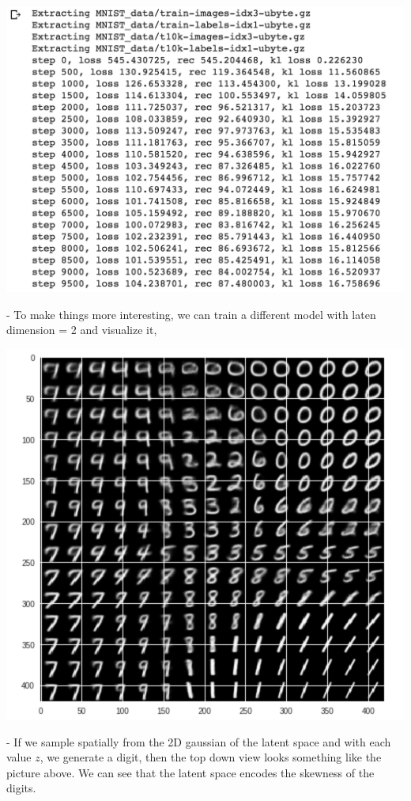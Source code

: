 \documentclass[graybox]{svmult}
\begin{document}
 \includegraphics[width=\textwidth]{train_process.png}
 
 - To make things more interesting, we can train a different model with laten dimension = 2 and visualize it,

\includegraphics[width=\textwidth]{top_infer.png}

- If we sample spatially from the 2D gaussian of the latent space and with each value $z$, we generate a digit, then the top down view looks something like the picture above. We can see that the latent space encodes the skewness of the digits.
\end{document}
